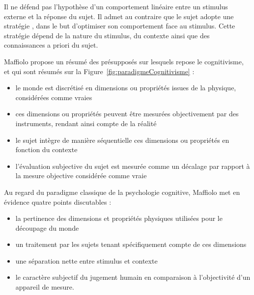 Il ne défend pas l'hypothèse d'un comportement linéaire entre un stimulus externe et la réponse du sujet. Il admet au contraire que le sujet adopte une stratégie  , dans le but d'optimiser son comportement face au stimulus. Cette stratégie dépend de la nature du stimulus, du contexte ainsi que des connaissances a priori du sujet.

Maffiolo propose un résumé des présupposés sur lesquels repose le cognitivisme, et qui sont résumés sur la Figure~\ref{fig:paradigmeCognitivisme} \citep[p. ??]{maffiolo_caracterisation_1999} :


\begin{itemize}
\item le monde est discrétisé en dimensions ou propriétés issues de la physique, considérées comme vraies
\item ces dimensions ou propriétés peuvent être mesurées objectivement par des instruments, rendant ainsi compte de la réalité
\item le sujet intègre de manière séquentielle ces dimensions ou propriétés en fonction du contexte
\item l'évaluation subjective du sujet est mesurée comme un décalage par rapport à la mesure objective considérée comme vraie
\end{itemize}

Au regard du paradigme classique de la psychologie cognitive, Maffiolo met en évidence quatre points discutables :

\begin{itemize}
\item la pertinence des dimensions et propriétés physiques utilisées pour le découpage du monde
\item un traitement par les sujets tenant spécifiquement compte de ces dimensions
\item une séparation nette entre stimulus et contexte
\item le caractère subjectif du jugement humain en comparaison à l'objectivité d'un appareil de mesure.
\end{itemize}

